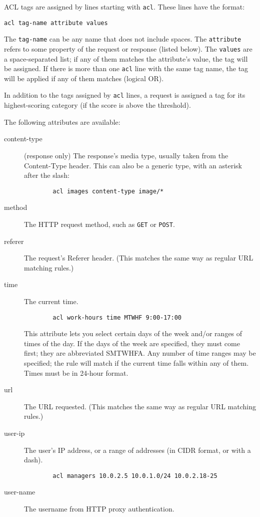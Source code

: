 \documentclass{article}
\begin{document}
ACL tags are assigned by lines starting with \verb"acl". 
These lines have the format:

\begin{verbatim}
acl tag-name attribute values
\end{verbatim}

The \verb"tag-name" can be any name that does not include spaces.
The \verb"attribute" refers to some property of the request or response (listed below).
The \verb"values" are a space-separated list; if any of them matches the attribute's value, the tag will be assigned.
If there is more than one \verb"acl" line with the same tag name, the tag will be applied if any of them matches (logical OR).

In addition to the tags assigned by \verb"acl" lines, a request is assigned a tag for its highest-scoring category
(if the score is above the threshold).

The following attributes are available:

\begin{description}

	\item[content-type] (response only) The response's media type, usually taken from the Content-Type header.
		This can also be a generic type, with an asterisk after the slash:

		\begin{verbatim}
		acl images content-type image/*
		\end{verbatim}

	\item[method] The HTTP request method, such as \verb"GET" or \verb"POST".

	\item[referer] The request's Referer header. (This matches the same way as regular URL matching rules.)

	\item[time] The current time.

		\begin{verbatim}
		acl work-hours time MTWHF 9:00-17:00
		\end{verbatim}

		This attribute lets you select certain days of the week and/or ranges of times of the day.
		If the days of the week are specified, they must come first; they are abbreviated SMTWHFA.
		Any number of time ranges may be specified; the rule will match if the current time falls within any of them.
		Times must be in 24-hour format.

	\item[url] The URL requested. (This matches the same way as regular URL matching rules.)

	\item[user-ip] The user's IP address, or a range of addresses (in CIDR format, or with a dash).

		\begin{verbatim}
		acl managers 10.0.2.5 10.0.1.0/24 10.0.2.18-25
		\end{verbatim}

	\item[user-name] The username from HTTP proxy authentication.
	
\end{description}
\end{document}
